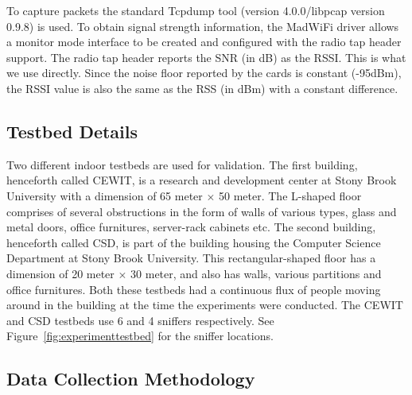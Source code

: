 To capture packets the standard Tcpdump tool (version 4.0.0/libpcap version 0.9.8) is used. To obtain signal strength information, the MadWiFi driver allows a
monitor mode interface to be created and configured with the radio tap header support. 
The radio tap header reports the SNR (in dB) as the RSSI. This is what we use directly. 
Since the noise floor reported by the cards is constant (-95dBm), the RSSI value 
is also the same as the RSS (in dBm) with a constant difference. 


\subsection{Testbed Details}
\label{subsec:testbeddetails}

Two different indoor testbeds are used for validation. The first building, henceforth called CEWIT, is a research and development center at Stony Brook University with a dimension of 65 meter $\times$ 50  meter. The L-shaped floor comprises of several obstructions in the form of walls of various types, glass and metal doors, office furnitures, server-rack cabinets etc. The second building, henceforth called CSD, is part of the building housing the Computer Science Department at Stony Brook University. This rectangular-shaped floor has a dimension of 20 meter $\times$ 30 meter, and also has walls, various partitions and office furnitures. Both these testbeds had a continuous flux of people moving around in the building at the time
the experiments were conducted. The CEWIT and CSD testbeds use 6 and 4 sniffers respectively. 
See Figure~\ref{fig:experimenttestbed} for the sniffer locations. 

\subsection{Data Collection Methodology}
\label{subsec:datacollectionmethodology}


